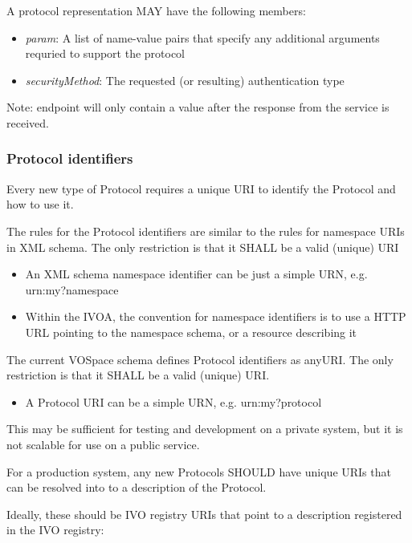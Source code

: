 \documentclass[11pt,a4paper]{ivoa}
\begin{document}
A protocol representation MAY have the following members:

\begin{itemize}
    \item \emph{param}: A list of name-value pairs that specify any additional arguments requried to support the protocol
    \item \emph{securityMethod}: The requested (or resulting) authentication type
\end{itemize}

Note: endpoint will only contain a value after the response from the service is received.

\subsubsection{Protocol identifiers}
\label{subsubsec:protocol identifiers}
Every new type of Protocol requires a unique URI to identify the Protocol and how to use it.

The rules for the Protocol identifiers are similar to the rules for namespace URIs in XML schema. The only restriction is that it SHALL be a valid (unique) URI

\begin{itemize}
    \item An XML schema namespace identifier can be just a simple URN, e.g. urn:my?namespace
    \item Within the IVOA, the convention for namespace identifiers is to use a HTTP URL pointing to the namespace schema, or a resource describing it
\end{itemize}

The current VOSpace schema defines Protocol identifiers as anyURI. The only restriction is that it SHALL be a valid (unique) URI.

\begin{itemize}
    \item A Protocol URI can be a simple URN, e.g. urn:my?protocol
\end{itemize}

This may be sufficient for testing and development on a private system, but it is not scalable for use on a public service.

For a production system, any new Protocols SHOULD have unique URIs that can be resolved into to a description of the Protocol.

Ideally, these should be IVO registry URIs that point to a description registered in the IVO registry:
\end{document}
